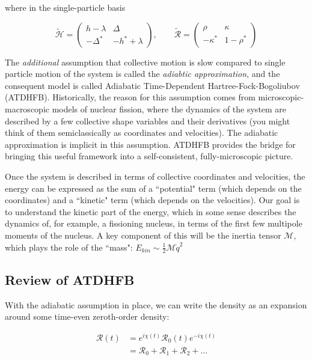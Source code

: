 \noindent where in the single-particle basis

\begin{equation*}
\mathcal{\tilde{H}} = 
\left(\begin{array}{cc}
h-\lambda & \Delta \\
-\Delta^* & -h^*+\lambda
\end{array}\right), 
\qquad \mathcal{\tilde{R}} = 
\left(\begin{array}{cc}
\rho & \kappa \\
-\kappa^* & 1-\rho^*
\end{array}\right)
\end{equation*}

The \textit{additional} assumption that collective motion is slow compared to single particle motion of the system is called the \textit{adiabtic approximation}, and the consequent model is called Adiabatic Time-Dependent Hartree-Fock-Bogoliubov (ATDHFB). Historically, the reason for this assumption comes from microscopic-macroscopic models of nuclear fission, where the dynamics of the system are described by a few collective shape variables and their derivatives (you might think of them semiclassically as coordinates and velocities). The adiabatic approximation is implicit in this assumption. ATDHFB provides the bridge for bringing this useful framework into a self-consistent, fully-microscopic picture.

Once the system is described in terms of collective coordinates and velocities, the energy can be expressed as the sum of a ``potential" term (which depends on the coordinates) and a ``kinetic" term (which depends on the velocities). Our goal is to understand the kinetic part of the energy, which in some sense describes the dynamics of, for example, a fissioning nucleus, in terms of the first few multipole moments of the nucleus. A key component of this will be the inertia tensor $\mathcal{M}$, which plays the role of the ``mass": $E_{kin}\sim\frac{1}{2}\mathcal{M}\dot{q}^2$

\subsection{Review of ATDHFB}

With the adiabatic assumption in place, we can write the density as an expansion around some time-even zeroth-order density:

\begin{align*}
\mathcal{R}(t) &= e^{i\chi(t)}\mathcal{R}_0(t)e^{-i\chi(t)} \\
&= \mathcal{R}_0 + \mathcal{R}_1 + \mathcal{R}_2 + \dots
\end{align*}

